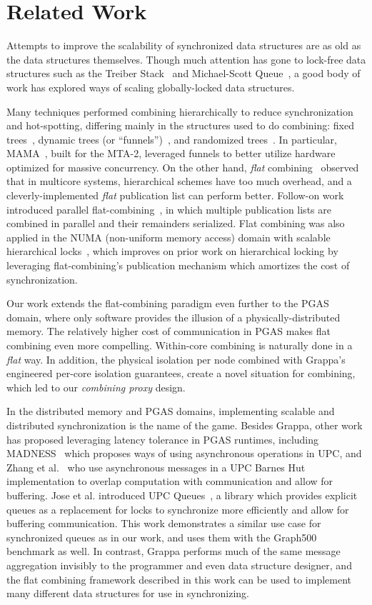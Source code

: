 \section{Related Work}
Attempts to improve the scalability of synchronized data structures are as old as the data structures themselves. Though much attention has gone to lock-free data structures such as the Treiber Stack~\cite{treiber} and Michael-Scott Queue~\cite{msqueue}, a good body of work has explored ways of scaling globally-locked data structures.

Many techniques performed combining hierarchically to reduce synchronization and hot-spotting, differing mainly in the structures used to do combining: fixed trees~\cite{yew:combining-trees}, dynamic trees (or ``funnels'')~\cite{funnels,MAMA}, and randomized trees~\cite{edtrees}. In particular, MAMA~\cite{MAMA}, built for the MTA-2, leveraged funnels to better utilize hardware optimized for massive concurrency.
On the other hand, \emph{flat} combining~\cite{flatCombining} observed that in multicore systems, hierarchical schemes have too much overhead, and a cleverly-implemented \emph{flat} publication list can perform better.
Follow-on work introduced parallel flat-combining~\cite{scalableFCQueues}, in which multiple publication lists are combined in parallel and their remainders serialized.
Flat combining was also applied in the NUMA (non-uniform memory access) domain with scalable hierarchical locks~\cite{fcNUMALocks}, which improves on prior work on hierarchical locking by leveraging flat-combining's publication mechanism which amortizes the cost of synchronization.

Our work extends the flat-combining paradigm even further to the PGAS domain, where only software provides the illusion of a physically-distributed memory. The relatively higher cost of communication in PGAS makes flat combining even more compelling. Within-core combining is naturally done in a \emph{flat} way. In addition, the physical isolation per node combined with Grappa's engineered per-core isolation guarantees, create a novel situation for combining, which led to our \emph{combining proxy} design.

In the distributed memory and PGAS domains, implementing scalable and distributed synchronization is the name of the game.
Besides Grappa, other work has proposed leveraging latency tolerance in PGAS runtimes, including MADNESS~\cite{shet:async-upc} which proposes ways of using asynchronous operations in UPC, and Zhang et al.~\cite{zhang:barnes-hut} who use asynchronous messages in a UPC Barnes Hut implementation to overlap computation with communication and allow for buffering.
Jose et al. introduced UPC Queues~\cite{jose:upc-queues}, a library which provides explicit queues as a replacement for locks to synchronize more efficiently and allow for buffering communication. This work demonstrates a similar use case for synchronized queues as in our work, and uses them with the Graph500 benchmark as well. In contrast, Grappa performs much of the same message aggregation invisibly to the programmer and even data structure designer, and the flat combining framework described in this work can be used to implement many different data structures for use in synchronizing.

